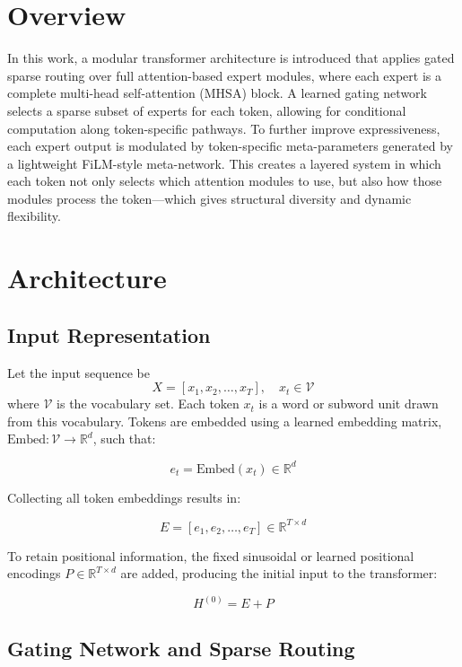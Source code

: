 \documentclass{article}
\begin{document}
\section{Overview}
In this work, a modular transformer architecture is introduced that applies gated sparse routing over full attention-based expert modules, where each expert is a complete multi-head self-attention (MHSA) block. A learned gating network selects a sparse subset of experts for each token, allowing for conditional computation along token-specific pathways. To further improve expressiveness, each expert output is modulated by token-specific meta-parameters generated by a lightweight FiLM-style meta-network. This creates a layered system in which each token not only selects which attention modules to use, but also how those modules process the token—which gives structural diversity and dynamic flexibility.
\vspace{3pt}



\section{Architecture}

\subsection{Input Representation}

Let the input sequence be 
\[
X = [x_1, x_2, \dots, x_T], \quad x_t \in \mathcal{V}
\]
where \( \mathcal{V} \) is the vocabulary set. Each token \( x_t \) is a word or subword unit drawn from this vocabulary. Tokens are embedded using a learned embedding matrix, \( \text{Embed}: \mathcal{V} \to \mathbb{R}^d \), such that:

\[
e_t = \text{Embed}(x_t) \in \mathbb{R}^d
\]

\noindent
Collecting all token embeddings results in:

\[
E = [e_1, e_2, \dots, e_T] \in \mathbb{R}^{T \times d}
\]


\noindent
To retain positional information, the fixed sinusoidal or learned positional encodings \( P \in \mathbb{R}^{T \times d} \) are added, producing the initial input to the transformer:

\[
H^{(0)} = E + P
\]

\subsection{Gating Network and Sparse Routing}
\end{document}
